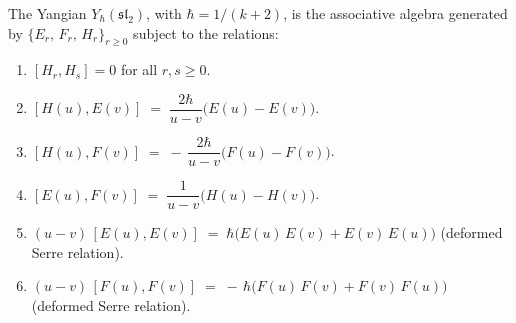 \begin{theorem}
\ClaimStatusProvedHere
\label{thm:drinfeld-yangian-sl2}
The Yangian $Y_\hbar(\mathfrak{sl}_2)$, with $\hbar = 1/(k+2)$, is the
associative algebra generated by $\{E_r,\,F_r,\,H_r\}_{r \ge 0}$ subject
to the relations:
\begin{enumerate}[label=\textup{(D\arabic*)},leftmargin=3.5em]
\item\label{drinfeld-sl2-D1} $[H_r, H_s] = 0$ for all $r,s \ge 0$.

\item\label{drinfeld-sl2-D2}
$[H(u), E(v)] \;=\; \dfrac{2\hbar}{u-v}\bigl(E(u) - E(v)\bigr)$.

\item\label{drinfeld-sl2-D3} $[H(u), F(v)] \;=\; -\,\dfrac{2\hbar}{u-v}\bigl(F(u) - F(v)\bigr)$.

\item\label{drinfeld-sl2-D4} $[E(u), F(v)] \;=\; \dfrac{1}{u-v}\bigl(H(u) - H(v)\bigr)$.

\item\label{drinfeld-sl2-D5} $(u{-}v)\,[E(u), E(v)]
\;=\; \hbar\bigl(E(u)\,E(v) + E(v)\,E(u)\bigr)$
\textup{(}deformed Serre relation\textup{)}.

\item\label{drinfeld-sl2-D6} $(u{-}v)\,[F(u), F(v)]
\;=\; -\,\hbar\bigl(F(u)\,F(v) + F(v)\,F(u)\bigr)$
\textup{(}deformed Serre relation\textup{)}.
\end{enumerate}
\end{theorem}

